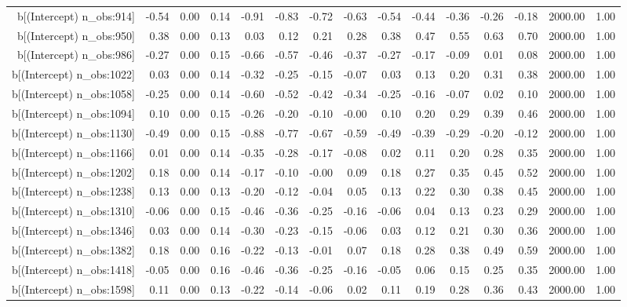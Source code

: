 \begin{table}[ht]
\begin{tabular}{rrrrrrrrrrrrrrr}
  b[(Intercept) n\_obs:914] & -0.54 & 0.00 & 0.14 & -0.91 & -0.83 & -0.72 & -0.63 & -0.54 & -0.44 & -0.36 & -0.26 & -0.18 & 2000.00 & 1.00 \\ 
  b[(Intercept) n\_obs:950] & 0.38 & 0.00 & 0.13 & 0.03 & 0.12 & 0.21 & 0.28 & 0.38 & 0.47 & 0.55 & 0.63 & 0.70 & 2000.00 & 1.00 \\ 
  b[(Intercept) n\_obs:986] & -0.27 & 0.00 & 0.15 & -0.66 & -0.57 & -0.46 & -0.37 & -0.27 & -0.17 & -0.09 & 0.01 & 0.08 & 2000.00 & 1.00 \\ 
  b[(Intercept) n\_obs:1022] & 0.03 & 0.00 & 0.14 & -0.32 & -0.25 & -0.15 & -0.07 & 0.03 & 0.13 & 0.20 & 0.31 & 0.38 & 2000.00 & 1.00 \\ 
  b[(Intercept) n\_obs:1058] & -0.25 & 0.00 & 0.14 & -0.60 & -0.52 & -0.42 & -0.34 & -0.25 & -0.16 & -0.07 & 0.02 & 0.10 & 2000.00 & 1.00 \\ 
  b[(Intercept) n\_obs:1094] & 0.10 & 0.00 & 0.15 & -0.26 & -0.20 & -0.10 & -0.00 & 0.10 & 0.20 & 0.29 & 0.39 & 0.46 & 2000.00 & 1.00 \\ 
  b[(Intercept) n\_obs:1130] & -0.49 & 0.00 & 0.15 & -0.88 & -0.77 & -0.67 & -0.59 & -0.49 & -0.39 & -0.29 & -0.20 & -0.12 & 2000.00 & 1.00 \\ 
  b[(Intercept) n\_obs:1166] & 0.01 & 0.00 & 0.14 & -0.35 & -0.28 & -0.17 & -0.08 & 0.02 & 0.11 & 0.20 & 0.28 & 0.35 & 2000.00 & 1.00 \\ 
  b[(Intercept) n\_obs:1202] & 0.18 & 0.00 & 0.14 & -0.17 & -0.10 & -0.00 & 0.09 & 0.18 & 0.27 & 0.35 & 0.45 & 0.52 & 2000.00 & 1.00 \\ 
  b[(Intercept) n\_obs:1238] & 0.13 & 0.00 & 0.13 & -0.20 & -0.12 & -0.04 & 0.05 & 0.13 & 0.22 & 0.30 & 0.38 & 0.45 & 2000.00 & 1.00 \\ 
  b[(Intercept) n\_obs:1310] & -0.06 & 0.00 & 0.15 & -0.46 & -0.36 & -0.25 & -0.16 & -0.06 & 0.04 & 0.13 & 0.23 & 0.29 & 2000.00 & 1.00 \\ 
  b[(Intercept) n\_obs:1346] & 0.03 & 0.00 & 0.14 & -0.30 & -0.23 & -0.15 & -0.06 & 0.03 & 0.12 & 0.21 & 0.30 & 0.36 & 2000.00 & 1.00 \\ 
  b[(Intercept) n\_obs:1382] & 0.18 & 0.00 & 0.16 & -0.22 & -0.13 & -0.01 & 0.07 & 0.18 & 0.28 & 0.38 & 0.49 & 0.59 & 2000.00 & 1.00 \\ 
  b[(Intercept) n\_obs:1418] & -0.05 & 0.00 & 0.16 & -0.46 & -0.36 & -0.25 & -0.16 & -0.05 & 0.06 & 0.15 & 0.25 & 0.35 & 2000.00 & 1.00 \\ 
  b[(Intercept) n\_obs:1598] & 0.11 & 0.00 & 0.13 & -0.22 & -0.14 & -0.06 & 0.02 & 0.11 & 0.19 & 0.28 & 0.36 & 0.43 & 2000.00 & 1.00 \\ 

\end{tabular}
\end{table}
